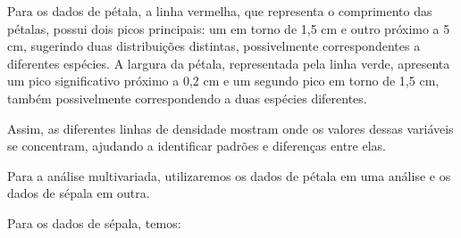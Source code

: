\documentclass[
  a4paperpaper,
]{article}
\newenvironment{Shaded}{\begin{snugshade}}{\end{snugshade}}
\newcommand{\AttributeTok}[1]{\textcolor[rgb]{0.40,0.45,0.13}{#1}}
\newcommand{\CommentTok}[1]{\textcolor[rgb]{0.37,0.37,0.37}{#1}}
\newcommand{\ConstantTok}[1]{\textcolor[rgb]{0.56,0.35,0.01}{#1}}
\newcommand{\DecValTok}[1]{\textcolor[rgb]{0.68,0.00,0.00}{#1}}
\newcommand{\FunctionTok}[1]{\textcolor[rgb]{0.28,0.35,0.67}{#1}}
\newcommand{\NormalTok}[1]{\textcolor[rgb]{0.00,0.23,0.31}{#1}}
\newcommand{\OtherTok}[1]{\textcolor[rgb]{0.00,0.23,0.31}{#1}}
\newcommand{\SpecialCharTok}[1]{\textcolor[rgb]{0.37,0.37,0.37}{#1}}
\newcommand{\StringTok}[1]{\textcolor[rgb]{0.13,0.47,0.30}{#1}}
\begin{document}
Para os dados de pétala, a linha vermelha, que representa o comprimento
das pétalas, possui dois picos principais: um em torno de 1,5 cm e outro
próximo a 5 cm, sugerindo duas distribuições distintas, possivelmente
correspondentes a diferentes espécies. A largura da pétala, representada
pela linha verde, apresenta um pico significativo próximo a 0,2 cm e um
segundo pico em torno de 1,5 cm, também possivelmente correspondendo a
duas espécies diferentes.

Assim, as diferentes linhas de densidade mostram onde os valores dessas
variáveis se concentram, ajudando a identificar padrões e diferenças
entre elas.

Para a análise multivariada, utilizaremos os dados de pétala em uma
análise e os dados de sépala em outra.

Para os dados de sépala, temos:

~

\begin{Shaded}
\end{Shaded}
\end{document}
